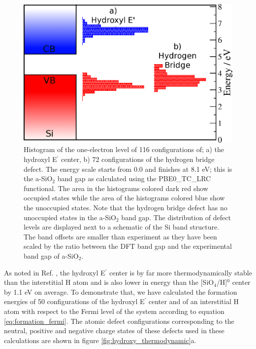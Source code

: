 \documentclass[aps,prb,reprint,superscriptaddress,showpacs]{revtex4-1}
\begin{document}
\begin{figure}[h!]
\includegraphics{hdefects_sisio2.png}
\caption{Histogram of the one-electron level of 116 configurations of; a) the hydroxyl E$^\prime$ center, b) 72 configurations of the hydrogen bridge defect. The energy scale starts from 0.0 and finishes at 8.1 eV; this is the a-SiO$_2$ band gap as calculated using the PBE0\_TC\_LRC functional. The area in the histograms colored dark red show occupied states while the area of the histograms colored blue show the unoccupied states. Note that the hydrogen bridge defect has no unoccupied states in the a-SiO$_2$ band gap. The distribution of defect levels are displayed next to a schematic of the Si band structure. The band offsets are smaller than experiment as they have been scaled by the ratio between the DFT band gap and the experimental band gap of a-SiO$_2$.} 
\label{fig:sio2_h_dos}
\end{figure}

As noted in Ref. \cite{aelsayed_prl}, the hydroxyl E$^\prime$ center is by far more thermodynamically stable than the interstitial H atom and is also lower in energy than the [SiO$_4$/H]$^0$ center by 1.1 eV on average. To demonstrate that, we have calculated the formation energies of 50 configurations of the hydroxyl E$^\prime$ center and of an interstitial H atom with respect to the Fermi level of the system according to equation \ref{eq:formation_fermi}. The atomic defect configurations corresponding to the neutral, positive and negative charge states of these defects used in these calculations are shown in figure \ref{fig:hydroxy_thermodynamic}a. 
\end{document}
